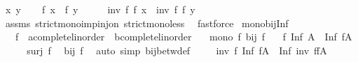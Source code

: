 \begin{isabellebody}
\ x\ y\isanewline
\ \ \isamarkupfalse%
\ {\isachardoublequoteopen}f\ x\ {\isacharless}{\kern0pt}\ f\ y{\isachardoublequoteclose}\isanewline
\ \ \isamarkupfalse%
\ \isamarkupfalse%
\ {\isachardoublequoteopen}inv\ f\ {\isacharparenleft}{\kern0pt}f\ x{\isacharparenright}{\kern0pt}\ {\isacharless}{\kern0pt}\ inv\ f\ {\isacharparenleft}{\kern0pt}f\ y{\isacharparenright}{\kern0pt}{\isachardoublequoteclose}\isanewline
\ \ \ \ \isamarkupfalse%
\ assms\ strict{\isacharunderscore}{\kern0pt}mono{\isacharunderscore}{\kern0pt}imp{\isacharunderscore}{\kern0pt}inj{\isacharunderscore}{\kern0pt}on\ strict{\isacharunderscore}{\kern0pt}mono{\isacharunderscore}{\kern0pt}less\ \isamarkupfalse%
\ fastforce\isanewline
{}\isamarkupfalse%
%
\endisatagproof
{\isafoldproof}%
%
\isadelimproof
\isanewline
%
\endisadelimproof
\isanewline
{}\isamarkupfalse%
\ mono{\isacharunderscore}{\kern0pt}bij{\isacharunderscore}{\kern0pt}Inf{\isacharcolon}{\kern0pt}\isanewline
\ \ \ f\ {\isacharcolon}{\kern0pt}{\isacharcolon}{\kern0pt}\ {\isachardoublequoteopen}{\isacharprime}{\kern0pt}a{\isacharcolon}{\kern0pt}{\isacharcolon}{\kern0pt}complete{\isacharunderscore}{\kern0pt}linorder\ {\isasymRightarrow}\ {\isacharprime}{\kern0pt}b{\isacharcolon}{\kern0pt}{\isacharcolon}{\kern0pt}complete{\isacharunderscore}{\kern0pt}linorder{\isachardoublequoteclose}\isanewline
\ \ \ {\isachardoublequoteopen}mono\ f{\isachardoublequoteclose}\ {\isachardoublequoteopen}bij\ f{\isachardoublequoteclose}\isanewline
\ \ \ {\isachardoublequoteopen}f\ {\isacharparenleft}{\kern0pt}Inf\ A{\isacharparenright}{\kern0pt}\ {\isacharequal}{\kern0pt}\ Inf\ {\isacharparenleft}{\kern0pt}f{\isacharbackquote}{\kern0pt}A{\isacharparenright}{\kern0pt}{\isachardoublequoteclose}\isanewline
%
\isadelimproof
%
\endisadelimproof
%
\isatagproof
{}\isamarkupfalse%
\ {\isacharminus}{\kern0pt}\isanewline
\ \ \isamarkupfalse%
\ {\isachardoublequoteopen}surj\ f{\isachardoublequoteclose}\ \isamarkupfalse%
\ {\isacartoucheopen}bij\ f{\isacartoucheclose}\ \isamarkupfalse%
\ {\isacharparenleft}{\kern0pt}auto\ simp{\isacharcolon}{\kern0pt}\ bij{\isacharunderscore}{\kern0pt}betw{\isacharunderscore}{\kern0pt}def{\isacharparenright}{\kern0pt}\isanewline
\ \ \isamarkupfalse%
\ {\isacharasterisk}{\kern0pt}{\isacharcolon}{\kern0pt}\ {\isachardoublequoteopen}{\isacharparenleft}{\kern0pt}inv\ f{\isacharparenright}{\kern0pt}\ {\isacharparenleft}{\kern0pt}Inf\ {\isacharparenleft}{\kern0pt}f{\isacharbackquote}{\kern0pt}A{\isacharparenright}{\kern0pt}{\isacharparenright}{\kern0pt}\ {\isasymle}\ Inf\ {\isacharparenleft}{\kern0pt}{\isacharparenleft}{\kern0pt}inv\ f{\isacharparenright}{\kern0pt}{\isacharbackquote}{\kern0pt}{\isacharparenleft}{\kern0pt}f{\isacharbackquote}{\kern0pt}A{\isacharparenright}{\kern0pt}{\isacharparenright}{\kern0pt}{\isachardoublequoteclose}\isanewline

\end{isabellebody}

